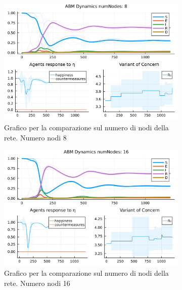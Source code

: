 \begin{figure}[!hb]
	\centering
	\begin{subfigure}[b]{0.45\textwidth}
		\centering
		\includegraphics[width=\textwidth]{img/SocialNetworkABM_1_NN.jpg}
		\caption{Grafico per la comparazione sul numero di nodi della rete. Numero nodi 8}
		\label{fig:comparison_numberOfNodes_8}
	\end{subfigure}
	\hfill
	\begin{subfigure}[b]{0.45\textwidth}
		\centering
		\includegraphics[width=\textwidth]{img/SocialNetworkABM_2_NN.jpg}
		\caption{Grafico per la comparazione sul numero di nodi della rete. Numero nodi 16}
		\label{fig:comparison_numberOfNodes_16}
	\end{subfigure}
	\hfill
	\begin{subfigure}[b]{0.45\textwidth}
		\centering

\end{subfigure}
\end{figure}
